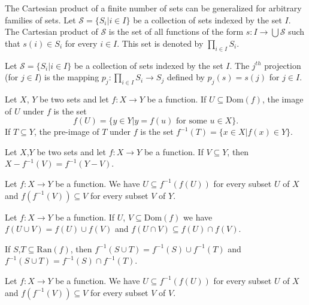 \documentclass[../main.tex]{subfiles}
\begin{document}
The Cartesian product of a finite number of sets can be generalized for arbitrary families of sets. Let $\mathcal{S}=\{S_i|i\in I\}$ be a collection of sets indexed by the set $I$. The Cartesian product of $\mathcal{S}$ is the set of all functions of the form $s:I\rightarrow \bigcup\mathcal{S}$ such that $s(i)\in S_i$ for every $i\in I$. This set is denoted by $\prod_{i\in I}S_i$.

\begin{purple}
\begin{definition}
Let $\mathcal{S}=\{S_i|i\in I\}$ be a collection of sets indexed by the set $I$. The $j^{th}$ projection (for $j\in I$) is the mapping $p_j:\prod_{i\in I}S_i\rightarrow S_j$ defined by $p_j(s)=s(j)$ for $j\in I$.

Let $X$, $Y$ be two sets and let $f: X\rightarrow Y$ be a function. If $U\subseteq\text{Dom}(f)$, the image of $U$ under $f$ is the set 
$$
f(U)=\{y\in Y|y=f(u)\text{ for some } u\in X\}.
$$
If $T\subseteq Y$, the pre-image of $T$ under $f$ is the set $f^{-1}(T)=\{x\in X|f(x)\in Y\}$.
\end{definition}
\end{purple}

\begin{yellow}
\begin{theorem}
Let $X$,$Y$ be two sets and let $f:X\rightarrow Y$ be a function. If $V\subseteq Y$, then $X-f^{-1}(V)=f^{-1}(Y-V)$.
\end{theorem}
\end{yellow}

\begin{yellow}
\begin{theorem}
Let $f:X\rightarrow Y$ be a function. We have $U\subseteq f^{-1}(f(U))$ for every subset $U$ of $X$ and $f(f^{-1}(V))\subseteq V $ for every subset $V$ of $Y$.

Let $f: X\rightarrow Y$ be a function. If $U$, $V\subseteq\text{Dom}(f)$ we have $f(U\cup V)=f(U)\cup f(V)$ and $f(U\cap V)\subseteq f(U)\cap f(V)$.

If $S$,$T\subseteq\text{Ran}(f)$, then $f^{-1}(S\cup T)=f^{-1}(S)\cup f^{-1}(T)$ and $f^{-1}(S\cup T)=f^{-1}(S)\cap f^{-1}(T)$.
\end{theorem}
\end{yellow}

\begin{yellow}
\begin{theorem}

Let $f:X\rightarrow Y$ be a function. We have $U\subseteq f^{-1}(f(U))$ for every subset $U$ of $X$ and $f(f^{-1}(V))\subseteq V$ for every subset $V$ of $V$.

\end{theorem}
\end{yellow}
\end{document}
